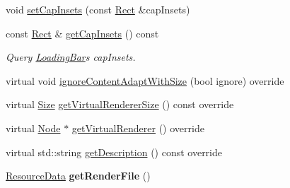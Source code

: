 \begin{DoxyCompactItemize}
void \hyperlink{classui_1_1LoadingBar_aa639bb577b731423bfce094995c61706}{set\+Cap\+Insets} (const \hyperlink{classRect}{Rect} \&cap\+Insets)
\item 
const \hyperlink{classRect}{Rect} \& \hyperlink{classui_1_1LoadingBar_aa2d6c3f411702d09c2388066a4ceb7ef}{get\+Cap\+Insets} () const
\begin{DoxyCompactList}\small\item\em Query \hyperlink{classui_1_1LoadingBar}{Loading\+Bar}\textquotesingle{}s cap\+Insets. \end{DoxyCompactList}\item 
virtual void \hyperlink{classui_1_1LoadingBar_aef1d41416277666e74f953b072f54964}{ignore\+Content\+Adapt\+With\+Size} (bool ignore) override
\item 
virtual \hyperlink{classSize}{Size} \hyperlink{classui_1_1LoadingBar_a7f0a12ed6e25f65890b71d34dd3f3c91}{get\+Virtual\+Renderer\+Size} () const override
\item 
virtual \hyperlink{classNode}{Node} $\ast$ \hyperlink{classui_1_1LoadingBar_a7c47d606b1f71e090a3d9d2a904dbd92}{get\+Virtual\+Renderer} () override
\item 
virtual std\+::string \hyperlink{classui_1_1LoadingBar_abf92eb9c1275d45339da7fdee00d4fcd}{get\+Description} () const override
\item 
\mbox{\label{classui_1_1LoadingBar_aeac4dc2b7824321c1f7c31566de63e9d}} 
\hyperlink{structResourceData}{Resource\+Data} {\bfseries get\+Render\+File} ()
\end{DoxyCompactItemize}
